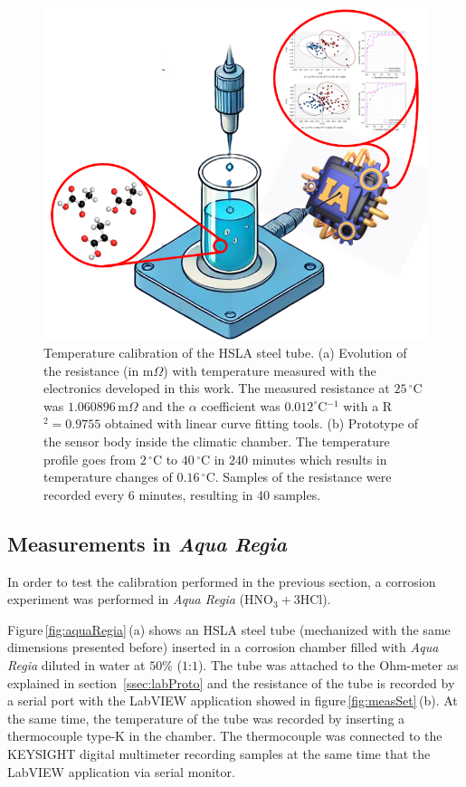 \documentclass[journal,twoside,web]{ieeecolor}
\begin{document}
\begin{figure}[!t]
\includegraphics [trim = 20mm 20mm 35mm 12mm, clip, width=1\columnwidth]{figures/fig0.png}
\caption{Temperature calibration of the HSLA steel tube. (a) Evolution of the resistance (in m$\Omega$) with temperature measured with the electronics developed in this work. The measured resistance at $25$\,$^{\circ}$C was $1.060896$\,m$\Omega$ and the $\alpha$ coefficient was $0.012 ^{\circ}$C$^{-1}$ with a R$^{2}=0.9755$ obtained with linear curve fitting tools. (b) Prototype of the sensor body inside the climatic chamber. The temperature profile goes from $2$\,$^{\circ}$C to $40$\,$^{\circ}$C in $240$ minutes which results in temperature changes of $0.16$\,$^{\circ}$C. Samples of the resistance were recorded every 6 minutes, resulting in 40 samples.}
\label{fig:tempCal}
\end{figure}
\subsection{Measurements in \textit{Aqua Regia}}
\label{ssec:measAquaRegia}
In order to test the calibration performed in the previous section, a corrosion experiment was performed in \textit{Aqua Regia} (HNO$_{3}+3$HCl).

Figure\,\ref{fig:aquaRegia}\,(a) shows an HSLA steel tube (mechanized with the same dimensions presented before)  inserted in a corrosion chamber filled with \textit{Aqua Regia} diluted in water at $50\%$ ($1$:$1$). The tube was attached to the Ohm-meter as explained in section~\ref{ssec:labProto} and the resistance of the tube is recorded by a serial port with the LabVIEW application showed in figure\,\ref{fig:measSet}\,(b). At the same time, the temperature of the tube was recorded by inserting a thermocouple type-K in the chamber. The thermocouple was connected to the KEYSIGHT digital multimeter recording samples at the same time that the LabVIEW application via serial monitor.
\end{document}
